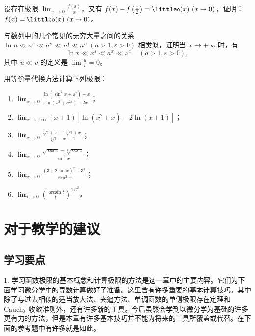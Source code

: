 \begin{xexercise}[2]
设存在极限 $\displaystyle\lim_{x\to0}\frac{f(x)}x$，又有 $f(x)-f\left(\frac x2\right)=\littleo(x)\ (x\to0)$，证明：$f(x)=\littleo(x)\ (x\to0)$。
\end{xexercise}

\begin{xexercise}[3]
与数列中的几个常见的无穷大量之间的关系 $\ln n\ll n^\varepsilon\ll a^n\ll n!\ll n^n\ (a>1,\varepsilon>0)$ 相类似，证明当 $x\to+\infty$ 时，有
  \[
    \ln x\ll x^\varepsilon\ll a^x\ll x^x\quad(a>1,\varepsilon>0),
  \]
  其中 $u\ll v$ 的定义是 $\displaystyle\lim\frac uv=0$。
\end{xexercise}

\begin{xexercise}[4]
用等价量代换方法计算下列极限：
  \begin{enumerate}
    \item $\displaystyle\lim_{x\to0}\frac{\ln(\sin^2x+\ee^x)-x}{\ln(x^2+\ee^{2x})-2x}$；
    \item $\displaystyle\lim_{x\to+\infty}(x+1)[\ln(x^2+x)-2\ln(x+1)]$；
    \item $\displaystyle\lim_{x\to0}\frac{\sqrt{1+x}-\sqrt[6]{1+x}}{\sqrt[3]{1+x}-1}$；
    \item $\displaystyle\lim_{x\to0}\frac{\sqrt{\cos x}-\sqrt[3]{\cos x}}{\sin^2x}$；
    \item $\displaystyle\lim_{x\to0}\frac{(3+2\sin x)^x-3^x}{\tan^2x}$；
    \item $\displaystyle\lim_{t\to0}\left(\frac{\arcsin t}{t}\right)^{1/t^2}$。
  \end{enumerate}
\end{xexercise}

\section{对于教学的建议}

\subsection{学习要点}

1. 学习函数极限的基本概念和计算极限的方法是这一章中的主要内容。它们为下面学习微分学中的导数计算做好了准备。这里含有许多重要的基本计算技巧。其中除了与过去相似的适当放大法、夹逼方法、单调函数的单侧极限存在定理和 Cauchy 收敛准则外，还有许多新的工具。今后虽然会学到以微分学为基础的许多更有力的方法，但是本章有许多基本技巧并不能为将来的工具所覆盖或代替。在下面的参考题中有许多就是如此。

